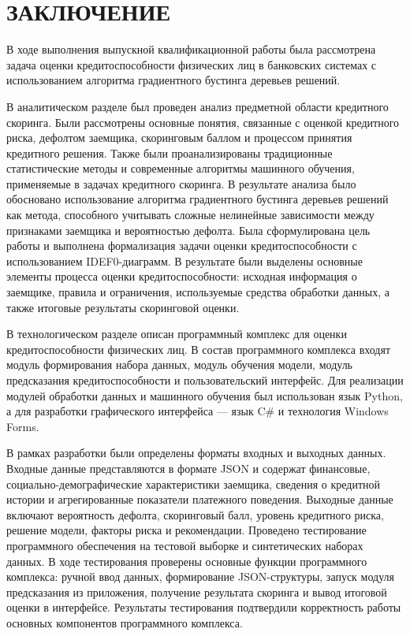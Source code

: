 \section*{ЗАКЛЮЧЕНИЕ}

В ходе выполнения выпускной квалификационной работы была рассмотрена задача оценки кредитоспособности физических лиц в банковских системах с использованием алгоритма градиентного бустинга деревьев решений.

В аналитическом разделе был проведен анализ предметной области кредитного скоринга. Были рассмотрены основные понятия, связанные с оценкой кредитного риска, дефолтом заемщика, скоринговым баллом и процессом принятия кредитного решения. Также были проанализированы традиционные статистические методы и современные алгоритмы машинного обучения, применяемые в задачах кредитного скоринга. В результате анализа было обосновано использование алгоритма градиентного бустинга деревьев решений как метода, способного учитывать сложные нелинейные зависимости между признаками заемщика и вероятностью дефолта.
Была сформулирована цель работы и выполнена формализация задачи оценки кредитоспособности с использованием IDEF0-диаграмм. В результате были выделены основные элементы процесса оценки кредитоспособности: исходная информация о заемщике, правила и ограничения, используемые средства обработки данных, а также итоговые результаты скоринговой оценки.

В технологическом разделе описан программный комплекс для оценки кредитоспособности физических лиц. В состав программного комплекса входят модуль формирования набора данных, модуль обучения модели, модуль предсказания кредитоспособности и пользовательский интерфейс. Для реализации модулей обработки данных и машинного обучения был использован язык Python, а для разработки графического интерфейса --- язык C\# и технология Windows Forms.

В рамках разработки были определены форматы входных и выходных данных. Входные данные представляются в формате JSON и содержат финансовые, социально-демографические характеристики заемщика, сведения о кредитной истории и агрегированные показатели платежного поведения. Выходные данные включают вероятность дефолта, скоринговый балл, уровень кредитного риска, решение модели, факторы риска и рекомендации. Проведено тестирование программного обеспечения на тестовой выборке и синтетических наборах данных. В ходе тестирования проверены основные функции программного комплекса: ручной ввод данных, формирование JSON-структуры, запуск модуля предсказания из приложения, получение результата скоринга и вывод итоговой оценки в интерфейсе. Результаты тестирования подтвердили корректность работы основных компонентов программного комплекса.

